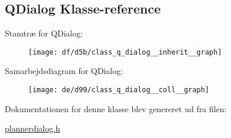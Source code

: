 \hypertarget{class_q_dialog}{}\subsection{Q\+Dialog Klasse-\/reference}
\label{class_q_dialog}


Stamtræ for Q\+Dialog\+:\nopagebreak
\begin{figure}[H]
\begin{center}
\leavevmode
\texttt{[image: df/d5b/class\_q\_dialog\_\_inherit\_\_graph]}
\end{center}
\end{figure}


Samarbejdsdiagram for Q\+Dialog\+:\nopagebreak
\begin{figure}[H]
\begin{center}
\leavevmode
\texttt{[image: de/d99/class\_q\_dialog\_\_coll\_\_graph]}
\end{center}
\end{figure}


Dokumentationen for denne klasse blev genereret ud fra filen\+:\begin{DoxyCompactItemize}
\item 
\hyperlink{plannerdialog_8h}{plannerdialog.\+h}\end{DoxyCompactItemize}
